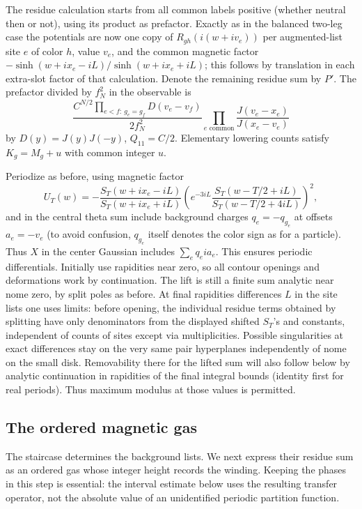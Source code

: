 The residue calculation starts from all common labels positive (whether neutral then or not), using its product as prefactor. Exactly as in the balanced two-leg case the potentials are now one copy of \(R_{g h}(i(w+i v_e))\) per augmented-list site \(e\) of color \(h\), value \(v_e\), and the common magnetic factor \(-\sinh(w+i x_e-iL)/\sinh(w+i x_e+iL)\); this follows by translation in each extra-slot factor of that calculation. Denote the remaining residue sum by \(P'\). The prefactor divided by \(f_N^2\) in the observable is
\begin{equation}
 \frac{C^{N/2}\prod_{e<f:\ g_e=g_f}D(v_e-v_f)}{2 f_N^2}
 \prod_{e\text{ common}} \frac{J(v_e-x_e)}{J(x_e-v_e)}
 \label{eq:legacy-P-23}
\end{equation}
by \(D(y)=J(y)J(-y)\), \(Q_{11}=C/2\). Elementary lowering counts satisfy \(K_g=M_g+u\) with common integer \(u\).



Periodize as before, using magnetic factor
\[
 U_T(w)=-\frac{S_T(w+i x_e-iL)}{S_T(w+i x_e+iL)}
 \left(e^{-3iL}\frac{S_T(w-T/2+iL)}{S_T(w-T/2+4iL)}\right)^2,
\]
and in the central theta sum include background charges \(q_e=-q_{g_e}\) at offsets \(a_e=-v_e\) (to avoid confusion, \(q_{g_e}\) itself denotes the color sign as for a particle). Thus \(X\) in the center Gaussian includes \(\sum_e q_e i a_e\). This ensures periodic differentials. Initially use rapidities near zero, so all contour openings and deformations work by continuation. The lift is still a finite sum analytic near nome zero, by split poles as before. At final rapidities differences \(L\) in the site lists one uses limits: before opening, the individual residue terms obtained by splitting have only denominators from the displayed shifted \(S_T\)'s and constants, independent of counts of sites except via multiplicities. Possible singularities at exact differences stay on the very same pair hyperplanes independently of nome on the small disk. Removability there for the lifted sum will also follow below by analytic continuation in rapidities of the final integral bounds (identity first for real periods). Thus maximum modulus at those values is permitted.



\subsection{The ordered magnetic gas}
\label{u:ordered-gas}

The staircase determines the background lists.  We next express their
residue sum as an ordered gas whose integer height records the winding.
Keeping the phases in this step is essential: the interval estimate below
uses the resulting transfer operator, not the absolute value of an
unidentified periodic partition function.

